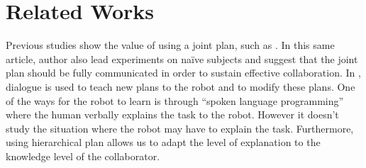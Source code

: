 \documentclass{llncs}
\begin{document}


\section{Related Works}





Previous studies show the value of using a joint plan, such as \cite{Lallee2013}. In this same article, author also lead experiments on na\"ive subjects and suggest that the joint plan should be fully communicated in order to sustain effective collaboration. In \cite{Petit2012}, dialogue is used to teach new plans to the robot and to modify these plans. One of the ways for the robot to learn is through ``spoken language programming'' where the human verbally explains the task to the robot. However it doesn't study the situation where the robot may have to explain the task. Furthermore, using hierarchical plan allows us to adapt the level of explanation to the knowledge level of the collaborator.


\end{document}
